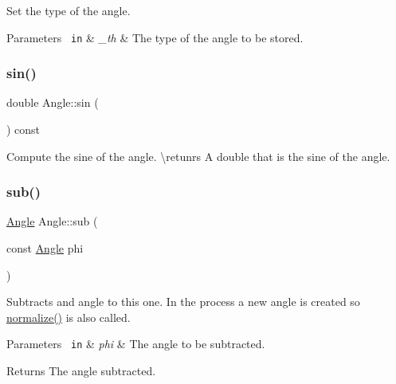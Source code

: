 Set the type of the angle. 


\begin{DoxyParams}[1]{Parameters}
\mbox{\texttt{ in}}  & {\em \+\_\+th} & The type of the angle to be stored. \\
\hline
\end{DoxyParams}
\mbox{\label{class_angle_a8ef2eabcb790d0b1fee0c2b4abaa50ba}} 
\subsubsection{\texorpdfstring{sin()}{sin()}}
{\footnotesize\ttfamily double Angle\+::sin (\begin{DoxyParamCaption}{ }\end{DoxyParamCaption}) const\hspace{0.3cm}{\ttfamily [inline]}}



Compute the sine of the angle. \textbackslash{}retunrs A {\ttfamily double} that is the sine of the angle. 

\mbox{\label{class_angle_a74797d883c7a00259f49a9e5dea01c0d}} 
\subsubsection{\texorpdfstring{sub()}{sub()}}
{\footnotesize\ttfamily \mbox{\hyperlink{class_angle}{Angle}} Angle\+::sub (\begin{DoxyParamCaption}\item[{const \mbox{\hyperlink{class_angle}{Angle}}}]{phi }\end{DoxyParamCaption})\hspace{0.3cm}{\ttfamily [inline]}}



Subtracts and angle to this one. In the process a new angle is created so {\ttfamily \mbox{\hyperlink{class_angle_a449fc0638ca2e26b4a57d1cce95788e8}{normalize()}}} is also called. 


\begin{DoxyParams}[1]{Parameters}
\mbox{\texttt{ in}}  & {\em phi} & The angle to be subtracted. \\
\hline
\end{DoxyParams}
\begin{DoxyReturn}{Returns}
The angle subtracted. 
\end{DoxyReturn}
\mbox{\label{class_angle_a2b1f249db1c3a2b741c2834b2d04d60a}} 
